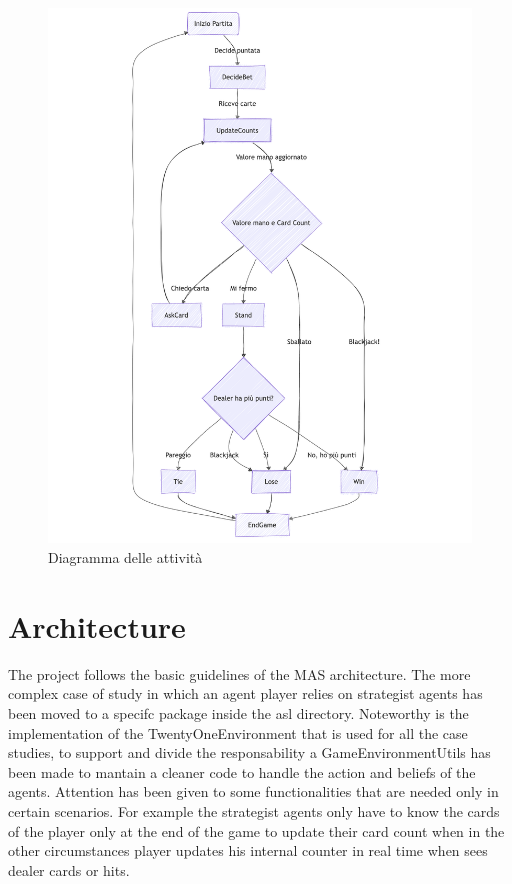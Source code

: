\begin{figure}[!htb]
    \centering
    \includegraphics[scale=0.55]{report/img/activityDiagram.png}
    \caption{Diagramma delle attività}
    \label{fig:activityDiagram}
\end{figure}


\section{Architecture}

The project follows the basic guidelines of the MAS architecture. The more complex case of study in which an agent player relies on strategist agents has been moved to a specifc package inside the asl directory. Noteworthy is the implementation of the TwentyOneEnvironment that is used for all the case studies, to support and divide the responsability a GameEnvironmentUtils has been made to mantain a cleaner code to handle the action and beliefs of the agents. Attention has been given to some functionalities that are needed only in certain scenarios. For example the strategist agents only have to know the cards of the player only at the end of the game to update their card count when in the other circumstances player updates his internal counter in real time when sees dealer cards or hits.

